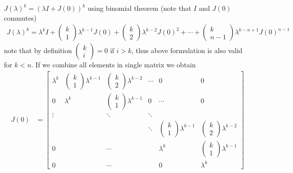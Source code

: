 \documentclass[twoside]{article}
\begin{document}
$J(\lambda)^k = \left( \lambda I +  J(0)\right)^k$ using binomial theorem (note that $I$ and $J(0)$ commutes)
%
\begin{align*}
	J(\lambda)^k = \lambda^k I + \left( \begin{array}{c} k \\ 1 \end{array} \right) \lambda^{k-1} J(0) + 
	\left( \begin{array}{c} k \\ 2 \end{array} \right) \lambda^{k-2} J(0)^2 + \cdots + 
	\left( \begin{array}{c} k \\ n-1 \end{array} \right) \lambda^{k-n+1} J(0)^{n-1} 
\end{align*}
% 
note that by definition $\left( \begin{array}{c} k \\ i \end{array} \right) = 0 $ if $i > k$, thus above formulation is also valid for $k < n$. If we combine 
all elements in single matrix we obtain
%
\begin{align*}
J(0) &= \left[  \begin{array}{cccccc} \lambda^k & \left( \begin{array}{c} k \\ 1 \end{array} \right) \lambda^{k-1} & \left( \begin{array}{c} k \\ 2 \end{array} \right) \lambda^{k-2} & \cdots & 0 & 0  
\\ 0 & \lambda^k & \left( \begin{array}{c} k \\ 1 \end{array} \right) \lambda^{k-1} & 0 & \cdots  & 0 \\ 
\vdots &  & \ddots & \ddots &  \\ & & & \ddots & \left( \begin{array}{c} k \\ 1 \end{array} \right) \lambda^{k-1} & \left( \begin{array}{c} k \\ 2 \end{array} \right) \lambda^{k-2} \\ 0 &  & \cdots  &  & \lambda^k & \left( \begin{array}{c} k \\ 1 \end{array} \right) \lambda^{k-1} \\
0 &  & \cdots &  & 0 & \lambda^k \end{array} \right] 
\end{align*}



\end{document}
